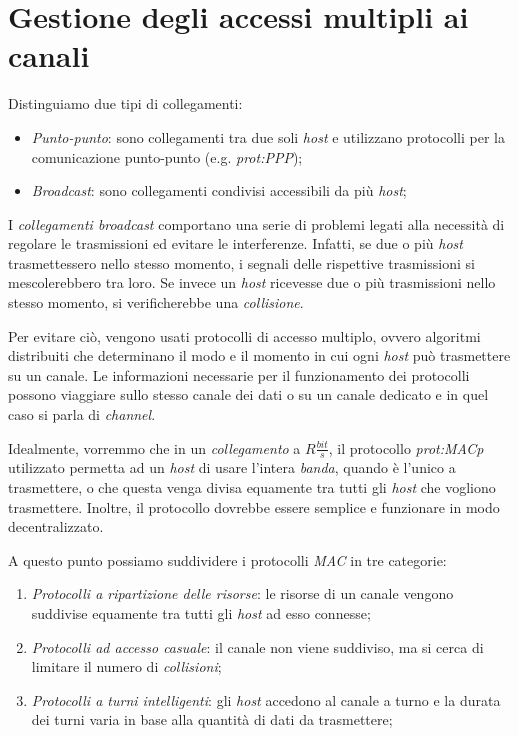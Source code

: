 \section{Gestione degli accessi multipli ai canali}
Distinguiamo due tipi di collegamenti:
\begin{itemize}
    \item \emph{Punto-punto}: sono collegamenti tra due soli \emph{host} e
    utilizzano protocolli per la comunicazione punto-punto (e.g. \emph{\gls{prot:PPP}});
    \item \emph{Broadcast}: sono collegamenti condivisi accessibili da più
    \emph{host};
\end{itemize}
I \emph{collegamenti broadcast} comportano una serie di problemi legati alla
necessità di regolare le trasmissioni ed evitare le interferenze. Infatti, se
due o più \emph{host} trasmettessero nello stesso momento, i segnali delle
rispettive trasmissioni si mescolerebbero tra loro. Se invece un \emph{host}
ricevesse due o più trasmissioni nello stesso momento, si verificherebbe una
\emph{collisione}.

Per evitare ciò, vengono usati protocolli di accesso multiplo, ovvero algoritmi
distribuiti che determinano il modo e il momento in cui ogni \emph{host} può
trasmettere su un canale. Le informazioni necessarie per il funzionamento dei
protocolli possono viaggiare sullo stesso canale dei dati o su un canale dedicato
e in quel caso si parla di \emph{ channel}.

Idealmente, vorremmo che in un \emph{collegamento} a $R\frac{bit}{s}$, il
protocollo \emph{\gls{prot:MACp}} utilizzato permetta ad un \emph{host} di usare
l'intera \emph{banda}, quando è l'unico a trasmettere, o che questa venga divisa
equamente tra tutti gli \emph{host} che vogliono trasmettere. Inoltre, il
protocollo dovrebbe essere semplice e funzionare in modo decentralizzato.

A questo punto possiamo suddividere i protocolli \emph{MAC} in tre categorie:
\begin{enumerate}
    \item \emph{Protocolli a ripartizione delle risorse}: le risorse di un
    canale vengono suddivise equamente tra tutti gli \emph{host} ad esso connesse;
    \item \emph{Protocolli ad accesso casuale}: il canale non viene suddiviso, ma
    si cerca di limitare il numero di \emph{collisioni};
    \item \emph{Protocolli a turni intelligenti}: gli \emph{host} accedono al
    canale a turno e la durata dei turni varia in base alla quantità di dati da
    trasmettere;
\end{enumerate}

